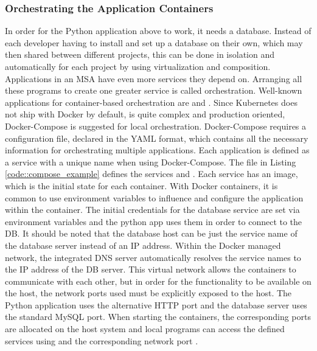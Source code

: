         \subsubsection{Orchestrating the Application Containers}
        In order for the Python application above to work, it needs a database. Instead of each developer having to install and set up a database on their own, which may then shared between different projects, this can be done in isolation and automatically for each project by using virtualization and composition. Applications in an \ac{MSA} have even more services they depend on. Arranging all these programs to create one greater service is called orchestration. Well-known applications for container-based orchestration are  and . Since Kubernetes does not ship with Docker by default, is quite complex and production oriented, Docker-Compose is suggested for local orchestration.\newline
        Docker-Compose requires a configuration file, declared in the \acs{YAML} format, which contains all the necessary information for orchestrating multiple applications. Each application is defined as a service with a unique name when using Docker-Compose. The  file in Listing \ref{code::compose_example} defines the services  and . Each service has an image, which is the initial state for each container. With Docker containers, it is common to use environment variables to influence and configure the application within the container. The initial credentials for the database service are set via environment variables and the python app uses them in order to connect to the \acl{DB}. It should be noted that the database host can be just the service name of the database server instead of an IP address. Within the Docker managed network, the integrated DNS server automatically resolves the service names to the IP address of the \ac{DB} server. This virtual network allows the containers to communicate with each other, but in order for the functionality to be available on the host, the network ports used must be explicitly exposed to the host. The Python application uses the alternative \acs{HTTP} port  and the database server uses the standard MySQL port. When starting the containers, the corresponding ports are allocated on the host system and local programs can access the defined services using  and the corresponding network port \cite{dockerdocs}.\newline
